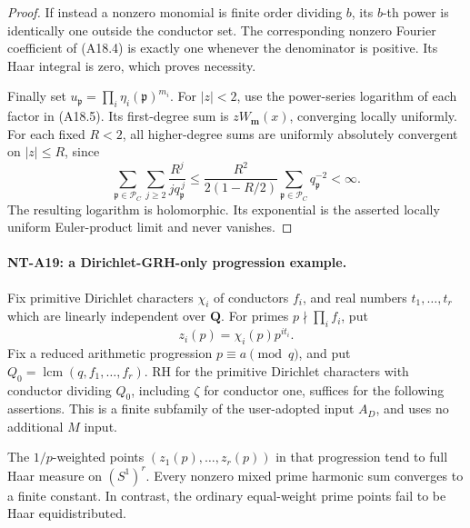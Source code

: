 \begin{proof}
If instead a nonzero monomial is finite order
dividing \(b\), its \(b\)-th power is identically
one outside the conductor set. The corresponding
nonzero Fourier coefficient of (A18.4) is exactly
one whenever the denominator is positive.
Its Haar integral is zero, which proves necessity.

Finally set \(u_{\mathfrak p}=\prod_i\eta_i(\mathfrak p)^{m_i}\).
For \(|z|<2\), use the power-series logarithm of
each factor in (A18.5). Its first-degree sum is
\(zW_{\mathbf m}(x)\), converging locally uniformly.
For each fixed \(R<2\), all higher-degree sums
are uniformly absolutely convergent on \(|z|\le R\),
since
\[
 \sum_{\mathfrak p\in\mathcal P_C}\sum_{j\ge2}
       \frac{R^j}{j q_{\mathfrak p}^{\,j}}
 \le \frac{R^2}{2(1-R/2)}
                 \sum_{\mathfrak p\in\mathcal P_C}q_{\mathfrak p}^{-2}
                                                    <\infty .
 \]
The resulting logarithm is holomorphic. Its
exponential is the asserted locally uniform
Euler-product limit and never vanishes.
\end{proof}

\paragraph{NT-A19: a Dirichlet-GRH-only progression example.}
Fix primitive Dirichlet characters \(\chi_i\) of
conductors \(f_i\), and real numbers \(t_1,\ldots,t_r\)
which are linearly independent over \(\mathbf Q\).
For primes \(p\nmid\prod_i f_i\), put
\[
                    z_i(p)=\chi_i(p)p^{it_i}.
 \]
Fix a reduced arithmetic progression \(p\equiv a\pmod q\),
and put \(Q_0=\operatorname{lcm}(q,f_1,\ldots,f_r)\).
RH for the primitive Dirichlet characters with
conductor dividing \(Q_0\), including \(\zeta\) for
conductor one, suffices for the following assertions.
This is a finite subfamily of the user-adopted input
\(A_D\), and uses no additional \(M\) input.

The \(1/p\)-weighted points \((z_1(p),\ldots,z_r(p))\)
in that progression tend to full Haar measure on
\((S^1)^r\). Every nonzero mixed prime harmonic sum
converges to a finite constant. In contrast, the
ordinary equal-weight prime points fail to be
Haar equidistributed.

